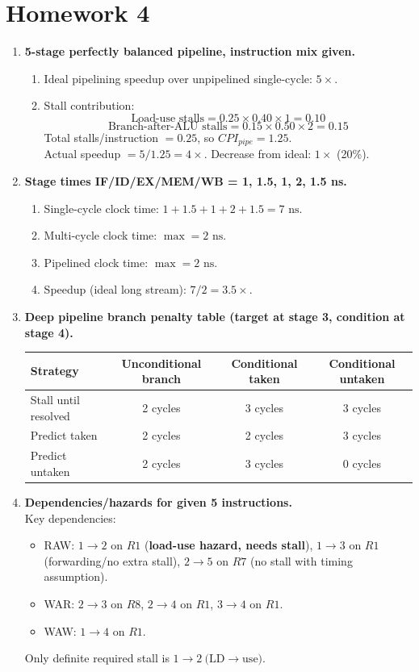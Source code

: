 \documentclass[11pt]{article}
\begin{document}
\section*{Homework 4}
\begin{enumerate}
\item \textbf{5-stage perfectly balanced pipeline, instruction mix given.}
\begin{enumerate}[label=(\alph*)]
\item Ideal pipelining speedup over unpipelined single-cycle: $\boxed{5\times}$.
\item Stall contribution:
\[
\text{Load-use stalls}=0.25\times0.40\times1=0.10
\]
\[
\text{Branch-after-ALU stalls}=0.15\times0.50\times2=0.15
\]
Total stalls/instruction $=0.25$, so $CPI_{pipe}=1.25$.\\
Actual speedup $=5/1.25=\boxed{4\times}$. Decrease from ideal: $\boxed{1\times}$ (20\%).
\end{enumerate}

\item \textbf{Stage times IF/ID/EX/MEM/WB = 1, 1.5, 1, 2, 1.5 ns.}
\begin{enumerate}[label=(\alph*)]
\item Single-cycle clock time: $1+1.5+1+2+1.5=\boxed{7\text{ ns}}$.
\item Multi-cycle clock time: $\max=\boxed{2\text{ ns}}$.
\item Pipelined clock time: $\max=\boxed{2\text{ ns}}$.
\item Speedup (ideal long stream): $7/2=\boxed{3.5\times}$.
\end{enumerate}

\item \textbf{Deep pipeline branch penalty table (target at stage 3, condition at stage 4).}\\
\begin{center}
\begin{tabular}{l|c|c|c}
Strategy & Unconditional branch & Conditional taken & Conditional untaken \\\hline
Stall until resolved & 2 cycles & 3 cycles & 3 cycles \\
Predict taken & 2 cycles & 2 cycles & 3 cycles \\
Predict untaken & 2 cycles & 3 cycles & 0 cycles \\
\end{tabular}
\end{center}

\item \textbf{Dependencies/hazards for given 5 instructions.}\\
Key dependencies:
\begin{itemize}
\item RAW: $1\to2$ on $R1$ (\textbf{load-use hazard, needs stall}), $1\to3$ on $R1$ (forwarding/no extra stall), $2\to5$ on $R7$ (no stall with timing assumption).
\item WAR: $2\to3$ on $R8$, $2\to4$ on $R1$, $3\to4$ on $R1$.
\item WAW: $1\to4$ on $R1$.
\end{itemize}
Only definite required stall is $\boxed{1\to2\ \text{(LD}\to\text{use)}}$.


\end{enumerate}
\end{document}

